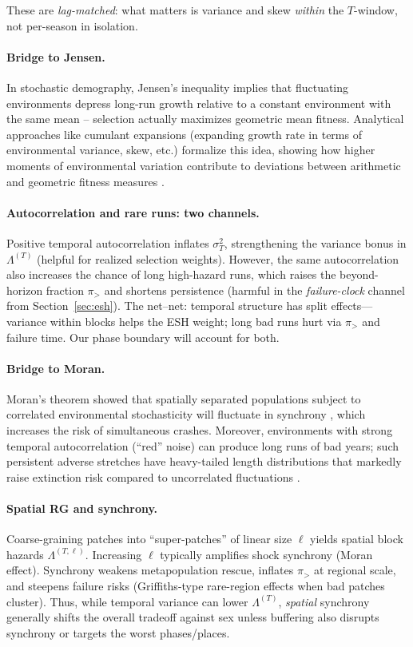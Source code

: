 \documentclass[11pt]{article}
\theoremstyle{upright}
\newcommand{\hazT}[1]{\Lambda^{(#1)}}          %
\begin{document}
These are \emph{lag-matched}: what matters is variance and skew \emph{within} the $T$-window, not per-season in isolation.

\paragraph{Bridge to Jensen.}
In stochastic demography, Jensen’s inequality implies that fluctuating environments depress long-run growth relative to a constant environment with the same mean – selection actually maximizes geometric mean fitness. Analytical approaches like cumulant expansions (expanding growth rate in terms of environmental variance, skew, etc.) formalize this idea, showing how higher moments of environmental variation contribute to deviations between arithmetic and geometric fitness measures \citep{Lewontin1969, Tuljapurkar1982}.

\paragraph{Autocorrelation and rare runs: two channels.}
Positive temporal autocorrelation inflates $\sigma_T^2$, strengthening the variance bonus in $\hazT{T}$ (helpful for realized selection weights). However, the same autocorrelation also increases the chance of long high-hazard runs, which raises the beyond-horizon fraction $\pi_{>}$ and shortens persistence (harmful in the \emph{failure-clock} channel from Section~\ref{sec:esh}). The net--net: temporal structure has split effects—variance within blocks helps the ESH weight; long bad runs hurt via $\pi_>$ and failure time. Our phase boundary will account for both.

\paragraph{Bridge to Moran.}
Moran’s theorem showed that spatially separated populations subject to correlated environmental stochasticity will fluctuate in synchrony \citep{Moran1953}, which increases the risk of simultaneous crashes. Moreover, environments with strong temporal autocorrelation (“red” noise) can produce long runs of bad years; such persistent adverse stretches have heavy-tailed length distributions that markedly raise extinction risk compared to uncorrelated fluctuations \citep{Ripa1996}.

\paragraph{Spatial RG and synchrony.}
Coarse-graining patches into “super-patches” of linear size $\ell$ yields spatial block hazards $\Lambda^{(T,\ell)}$. Increasing $\ell$ typically amplifies shock synchrony (Moran effect). Synchrony weakens metapopulation rescue, inflates $\pi_{>}$ at regional scale, and steepens failure risks (Griffiths-type rare-region effects when bad patches cluster). Thus, while temporal variance can lower $\hazT{T}$, \emph{spatial} synchrony generally shifts the overall tradeoff against sex unless buffering also disrupts synchrony or targets the worst phases/places.
\end{document}
